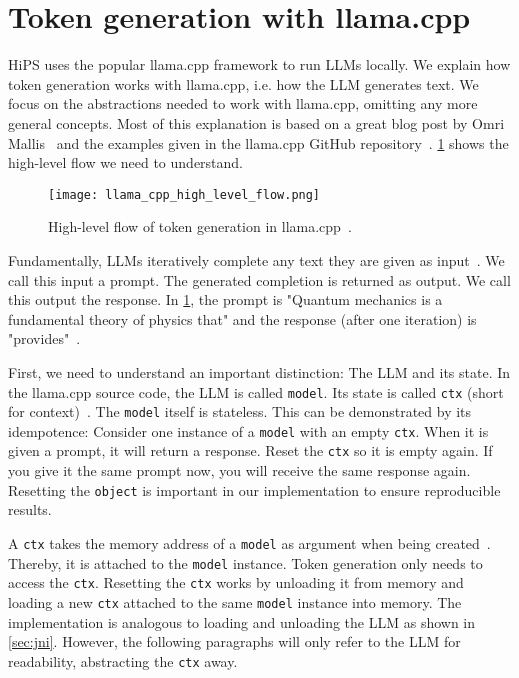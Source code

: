 \section{Token generation with llama.cpp}
\label{sec:tokenGenerationWithLlamaCpp}
\gls{HiPS} uses the popular llama.cpp framework to run \glspl{LLM} locally. We explain how token generation works with llama.cpp, i.e. how the \gls{LLM} generates text. We focus on the abstractions needed to work with llama.cpp, omitting any more general concepts. Most of this explanation is based on a great blog post by Omri Mallis~\cite{mallisUnderstandingHowLLM2023} and the examples given in the llama.cpp GitHub repository~\cite{gerganovGgerganovLlamacpp2024}. \cref{fig:llamaCppHighLevelFlow} shows the high-level flow we need to understand.

\begin{figure}
    \begin{wide}
        \captionsetup{width=\linewidth}
        \texttt{[image: llama\_cpp\_high\_level\_flow.png]}
        \caption[llama.cpp: Token generation]{High-level flow of token generation in llama.cpp~\cite{mallisUnderstandingHowLLM2023}.}
        \label{fig:llamaCppHighLevelFlow}
    \end{wide}
\end{figure}

Fundamentally, \glspl{LLM} iteratively complete any text they are given as input~\cite{mallisUnderstandingHowLLM2023}. We call this input a prompt. The generated completion is returned as output. We call this output the response. In \cref{fig:llamaCppHighLevelFlow}, the prompt is "Quantum mechanics is a fundamental theory of physics that" and the response (after one iteration) is "provides"~\cite{mallisUnderstandingHowLLM2023}.

First, we need to understand an important distinction: The \gls{LLM} and its state. In the llama.cpp source code, the \gls{LLM} is called \lstinline|model|. Its state is called \lstinline|ctx| (short for context)~\cite{gerganovGgerganovLlamacpp2024}. The \lstinline|model| itself is stateless. This can be demonstrated by its idempotence: Consider one instance of a \lstinline|model| with an empty \lstinline|ctx|. When it is given a prompt, it will return a response. Reset the \lstinline|ctx| so it is empty again. If you give it the same prompt now, you will receive the same response again. Resetting the \lstinline|object| is important in our implementation to ensure reproducible results.

A \lstinline|ctx| takes the memory address of a \lstinline|model| as argument when being created~\cite{gerganovGgerganovLlamacpp2024}. Thereby, it is attached to the \lstinline|model| instance. Token generation only needs to access the \lstinline|ctx|. Resetting the \lstinline|ctx| works by unloading it from memory and loading a new \lstinline|ctx| attached to the same \lstinline|model| instance into memory. The implementation is analogous to loading and unloading the \gls{LLM} as shown in \cref{sec:jni}. However, the following paragraphs will only refer to the \gls{LLM} for readability, abstracting the \lstinline|ctx| away.


